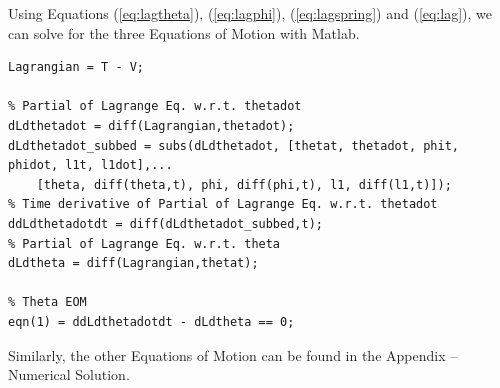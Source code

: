 \documentclass[12pt]{report}
\begin{document}
\begin{flushleft}
Using Equations (\ref{eq:lagtheta}), (\ref{eq:lagphi}), (\ref{eq:lagspring}) and (\ref{eq:lag}), we can
solve for the three Equations of Motion with Matlab.

\begin{lstlisting}[frame=lines,style=Matlab-editor,basicstyle = \mlttfamily]
Lagrangian = T - V;

% Partial of Lagrange Eq. w.r.t. thetadot
dLdthetadot = diff(Lagrangian,thetadot);
dLdthetadot_subbed = subs(dLdthetadot, [thetat, thetadot, phit, phidot, l1t, l1dot],...
    [theta, diff(theta,t), phi, diff(phi,t), l1, diff(l1,t)]);
% Time derivative of Partial of Lagrange Eq. w.r.t. thetadot
ddLdthetadotdt = diff(dLdthetadot_subbed,t);
% Partial of Lagrange Eq. w.r.t. theta
dLdtheta = diff(Lagrangian,thetat);

% Theta EOM
eqn(1) = ddLdthetadotdt - dLdtheta == 0;
\end{lstlisting}
Similarly, the other Equations of Motion can be found in the Appendix -- Numerical Solution.



\newpage

\end{flushleft}
\end{document}
